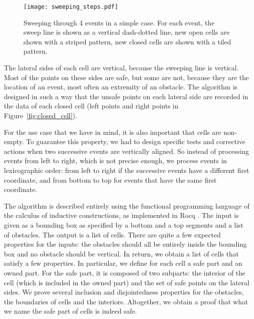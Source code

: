 \documentclass[a4paper, USenglish, cleveref, autoref, thm-restate, final]{lipics-v2021}
\begin{document}
\begin{figure}[h]
\begin{center}
\texttt{[image: sweeping\_steps.pdf]}
\end{center}
\caption{Sweeping through 4 events in a simple case.  For each event,
  the sweep line is shown as a vertical dash-dotted line,
  new open cells are shown with a striped pattern, new closed cells
  are shown with a tiled pattern.}
\label{fig:sweeping_steps}
\end{figure}

The lateral sides of each cell are vertical, because the sweeping line
is vertical.  Most of the points on these sides are safe, but
some are not,
because they are the location of an event, most often an extremity of an
obstacle.  The algorithm is designed in such a way that the unsafe
points on each lateral side are recorded in the data of each closed
cell (left points and right points in Figure~\ref{fig:closed_cell}).

For the use case that we have in mind, it is also important that cells
are non-empty.  To guarantee this property, we had to design specific
tests and corrective actions when two successive events are vertically
aligned.  So instead of processing events from left to right, which is
not precise enough, we process events in lexicographic order: from left to
right if the successive events have a different first coordinate, and
from bottom to top for events that have the same first coordinate.

The algorithm is described entirely using the functional programming
language of the calculus of inductive constructions, as implemented in
Rocq \cite{the_rocq_development_team_2025_15149629}.  The input is given as a bounding box as specified by a bottom and
a top segments and a list of obstacles.
The output is a list of cells.  There are quite a few expected
properties for the inputs: the obstacles should all be entirely inside
the bounding box and no obstacle should be vertical.  In return, we
obtain a list of cells that satisfy a few properties.  In particular,
we define for each cell a safe part and an owned part.  For the safe part,
it is composed of two subparts: the interior of the cell (which is included in
the owned part) and the set of safe points on the lateral sides.  We
prove several inclusion and disjointedness properties for the obstacles, the
boundaries of cells and the interiors.  Altogether, we obtain a proof that
what we name the safe part of cells is indeed safe.
\end{document}
